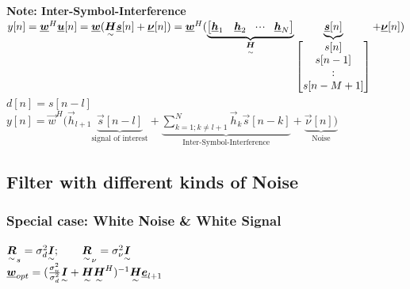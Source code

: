 \begin{doublespace}
\textbf{Note: Inter-Symbol-Interference}\\
$y[n]=\vec{w}^H\vec{u}[n] = \vec{w}(\ma{H}\vec{s}[n]+\vec{\nu}[n]) = \vec{w}^H(\underbrace{\mat{\vec{h}_1&\vec{h}_2&\shdots&\vec{h}_N}}_{\ma{H}}\underbrace{\vec{s}[n]}_{\mat{s[n]\\s[n-1]\\\svdots\\s[n-M+1]}}+\vec{\nu}[n])$\\
$d[n]=s[n-l]$\\
$y[n]=\vec{w}^H(\vec{h}_{l+1}\underbrace{\vec{s}[n-l]}_{\text{signal of interest}}+\underbrace{\sum\limits_{k=1; k\neq l+1}^{N}\vec{h}_k \vec{s}[n-k]}_{\text{Inter-Symbol-Interference}}+\underbrace{\vec{\nu}[n])}_{\text{Noise}}$\\
\subsection{Filter with different kinds of Noise}

\subsubsection{Special case: White Noise \& White Signal} 
$\ma{R}_s=\sigma_d^2\ma{I};\qquad \ma{R}_\nu=\sigma_\nu^2\ma{I}$\\
$\vec{w}_{opt}=(\frac{\sigma_u^2}{\sigma_d^2}\ma{I}+\ma{H}\ma{H}^H)^{-1}\ma{H}\vec{e}_{l+1}$\\
\\

\end{doublespace}

